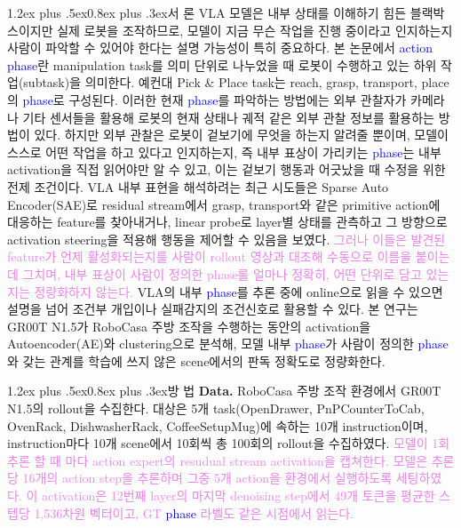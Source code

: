 \documentclass[a4paper,twocolumn,9pt]{extarticle}
\makeatletter
\newcommand{\term}[1]{\textcolor{blue}{#1}}  %
\newcommand{\rev}[1]{\textcolor{violet}{#1}}  %
\renewcommand\section{\@startsection{section}{1}{\z@}%
  {1.2ex plus .5ex}{0.8ex plus .3ex}{\normalsize\bfseries}}
\makeatother
\begin{document}
\section{서 론}
VLA 모델은 내부 상태를 이해하기 힘든 블랙박스이지만 실제 로봇을 조작하므로, 모델이 지금 무슨 작업을 진행 중이라고 인지하는지 사람이 파악할 수 있어야 한다는 설명 가능성이 특히 중요하다. 본 논문에서 \term{action phase}란 manipulation task를 의미 단위로 나누었을 때 로봇이 수행하고 있는 하위 작업(subtask)을 의미한다. 예컨대 Pick \& Place task는 reach, grasp, transport, place의 \term{phase}로 구성된다\cite{options}. 이러한 현재 \term{phase}를 파악하는 방법에는 외부 관찰자가 카메라나 기타 센서들을 활용해 로봇의 현재 상태나 궤적 같은 외부 관찰 정보를 활용하는 방법이 있다\cite{lotus}. 하지만 외부 관찰은 로봇이 겉보기에 무엇을 하는지 알려줄 뿐이며, 모델이 스스로 어떤 작업을 하고 있다고 인지하는지, 즉 내부 표상이 가리키는 \term{phase}는 내부 activation을 직접 읽어야만 알 수 있고, 이는 겉보기 행동과 어긋났을 때 수정을 위한 전제 조건이다. VLA 내부 표현을 해석하려는 최근 시도들은
Sparse Auto Encoder(SAE)로 residual stream에서 grasp, transport와 같은 primitive action에 대응하는 feature를 찾아내거나\cite{saevla,egsae}, linear probe로 layer별 상태를 관측하고 그 방향으로 activation steering을 적용해 행동을 제어할 수 있음을 보였다\cite{observing,mechinterp}. \rev{그러나 이들은 발견된 feature가 언제 활성화되는지를 사람이 rollout 영상과 대조해 수동으로 이름을 붙이는 데 그치며, 내부 표상이 사람이 정의한 phase를 얼마나 정확히, 어떤 단위로 담고 있는지는 정량화하지 않는다.} VLA의 내부 \term{phase}를 추론 중에 online으로 읽을 수 있으면 설명을 넘어 조건부 개입이나 실패감지\cite{safe}의 조건신호로 활용할 수 있다. 본 연구는 GR00T N1.5\cite{groot}가 RoboCasa\cite{robocasa} 주방 조작을 수행하는 동안의 activation을 Autoencoder(AE)와 clustering으로 분석해, 모델 내부 \term{phase}가 사람이 정의한 \term{phase}와 갖는 관계를 학습에 쓰지 않은 scene에서의 판독 정확도로 정량화한다. 

\section{방 법}
\textbf{Data. } RoboCasa 주방 조작 환경에서 GR00T N1.5의 rollout을 수집한다. 대상은 5개 task(OpenDrawer, PnPCounterToCab, OvenRack, DishwasherRack, CoffeeSetupMug)에 속하는 10개 instruction이며, instruction마다 10개 scene에서 10회씩 총 100회의 rollout을 수집하였다. \rev{모델이 1회 추론 할 때 마다 action expert의 resudual stream activation을 캡쳐한다. 모델은 추론당 16개의 action step을 추론하며 그중 5개 action을 환경에서 실행하도록 세팅하였다. 이 activation은 12번째 layer의 마지막 denoising step에서 49개 토큰을 평균한 스텝당 1{,}536차원 벡터이고, GT \term{phase} 라벨도 같은 시점에서 읽는다.}
\end{document}
